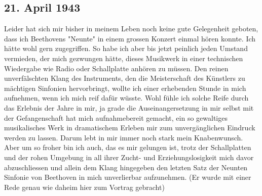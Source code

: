 \subsection{21. April 1943}

Leider hat sich mir bisher in meinem Leben noch keine gute Gelegenheit geboten, dass ich Beethovens "Neunte" in einem grossen Konzert einmal h\"{o}ren konnte.
Ich h\"{a}tte wohl gern zugegriffen.
So habe ich aber bis jetzt peinlich jeden Umstand vermieden, der mich gezwungen h\"{a}tte, dieses Musikwerk in einer technischen  Wiedergabe wie Radio oder Schallplatte anh\"{o}ren zu m\"{u}ssen.
Den reinen unverf\"{a}lschten Klang des Instruments, den die Meisterschaft des K\"{u}nstlers zu m\"{a}chtigen Sinfonien hervorbringt, wollte ich einer erhebenden Stunde in mich aufnehmen, wenn ich mich reif daf\"{u}r w\"{u}sste.
Wohl f\"{u}hle ich solche Reife durch das Erlebnis der Jahre in mir, ja grade die Auseinangersetzung in mir selbst mit der Gefangenschaft hat mich aufnahmebereit gemacht, ein so gewaltiges musikalisches Werk in dramatischem Erleben mir zum unverg\"{a}nglichen Eindruck werden zu lassen.
Darum lebt in mir immer noch stark mein Knabenwunsch.
Aber um so froher bin ich auch, das es mir gelungen ist, trotz der Schallplatten und der rohen Umgebung in all ihrer Zucht- und Erziehungslosigkeit mich davor abzuschliessen und allein dem Klang hingegeben den letzten Satz der Neunten Sinfonie von Beethoven in mich unverlierbar aufzunehmen.
(Er wurde mit einer Rede genau wie daheim hier zum Vortrag gebracht)

\clearpage
